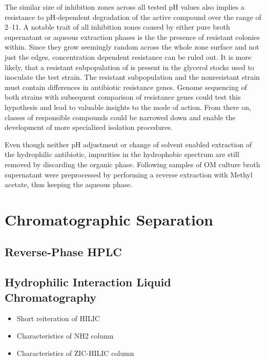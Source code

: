 The similar size of inhibition zones across all tested pH values also implies a resistance to pH-dependent degradation of the active compound over the range of 2--11.
A notable trait of all inhibition zones caused by either pure broth supernatant or aqueous extraction phases is the the presence of resistant colonies within.
Since they grow seemingly random across the whole zone surface and not just the edges, concentration dependent resistance can be ruled out.
It is more likely, that a resistant subpopulation of \coli{} is present in the glycerol stocks used to inoculate the test strain.
The resistant subpopulation and the nonresistant strain must contain differences in antibiotic resistance genes.
Genome sequencing of both strains with subsequent comparison of resistance genes could test this hypothesis and lead to valuable insights to the mode of action.
From there on, classes of responsible compounds could be narrowed down and enable the development of more specialized isolation procedures.

Even though neither pH adjustment or change of solvent enabled extraction of the hydrophilic antibiotic, impurities in the hydrophobic spectrum are still removed by discarding the organic phase.
Following samples of OM culture broth supernatant were preprocessed by performing a reverse extraction with Methyl acetate, thus keeping the aqueous phase.


\section{Chromatographic Separation} %
\label{sec:results_chromatographic_separation}

\subsection{Reverse-Phase HPLC} %
\label{sub:results_reverse_phase_hplc}


\subsection{Hydrophilic Interaction Liquid Chromatography} %
\label{sub:results_hydrophilic_interaction_chromatography}

\begin{itemize}
	\item Short reiteration of HILIC
	\item Characteristics of NH2 column
	\item Characteristics of ZIC-HILIC column
\end{itemize}

